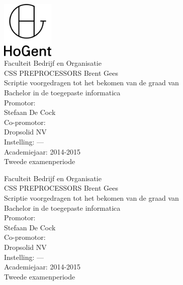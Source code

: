 \documentclass[pdftex,a4paper,12pt,twoside]{report}
\newcommand{\emptypage}{
\newpage
\thispagestyle{empty}
\mbox{}
\newpage
}
\newcommand{\student}{Brent Gees}
\newcommand{\promotor}{Stefaan De Cock}
\newcommand{\copromotor}{Dropsolid NV}
\newcommand{\instelling}{---}
\newcommand{\titel}{CSS PREPROCESSORS}
\newcommand{\faculteit}{Faculteit Bedrijf en Organisatie}
\newcommand{\rapporttype}{Scriptie voorgedragen tot het bekomen van de graad van\\Bachelor in de toegepaste informatica}
\newcommand{\academiejaar}{2014-2015}
\newcommand{\examenperiode}{Tweede examenperiode}
\begin{document}

\begin{titlepage}
  \begin{center}

    \begingroup
    \rmfamily
    \includegraphics[width=2.5cm]{img/HG-beeldmerk-woordmerk}\\[.5cm]
    \faculteit\\[3cm]
    \titel
    \vfill
    \student\\[3.5cm]
    \rapporttype\\[2cm]
    Promotor:\\
    \promotor\\
    Co-promotor:\\
    \copromotor\\[2.5cm]
    Instelling: \instelling\\[.5cm]
    Academiejaar: \academiejaar\\[.5cm]
    \examenperiode
    \endgroup

  \end{center}
  \restoregeometry
\end{titlepage}


\emptypage


\begin{titlepage}
  \begin{center}

    \begingroup
    \rmfamily
    \faculteit\\[3cm]
    \titel
    \vfill
    \student\\[3.5cm]
    \rapporttype\\[2cm]
    Promotor:\\
    \promotor\\
    Co-promotor:\\
    \copromotor\\[2.5cm]
    Instelling: \instelling\\[.5cm]
    Academiejaar: \academiejaar\\[.5cm]
    \examenperiode
    \endgroup

  \end{center}
  \restoregeometry
\end{titlepage}
\end{document}
